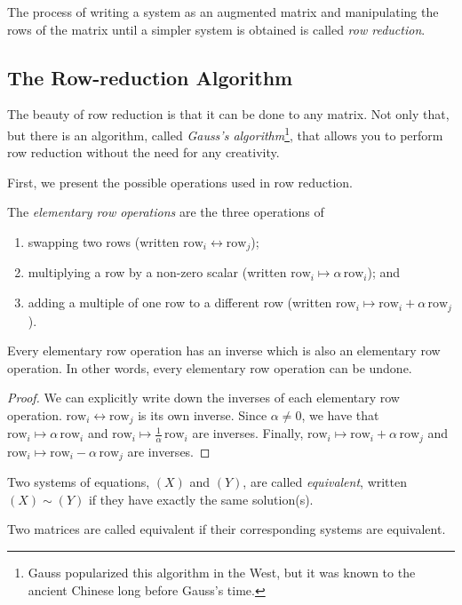 The process of writing a system as an augmented matrix and manipulating
the rows of the matrix until a simpler system is obtained is called
\emph{row reduction}.

\subsection{The Row-reduction Algorithm}
The beauty of row reduction is that it can be done to any matrix. Not only
that, but there is an algorithm, called \emph{Gauss's algorithm}\footnote{ Gauss
popularized this algorithm in the West, but it was known to the ancient Chinese
long before Gauss's time.}, that allows you to perform row reduction without
the need for any creativity.

First, we present the possible operations used in row reduction.
\begin{definition}
	The \emph{elementary row operations}
	are the three operations of
	\begin{enumerate}
		\item swapping two rows (written $\text{row}_i\leftrightarrow\text{row}_j$);
		\item multiplying a row by a non-zero scalar (written
		$\text{row}_i\mapsto \alpha\,\text{row}_i$); and
		\item adding a multiple of one row to a different row (written $\text{row}_i\mapsto
		\text{row}_i+\alpha\,\text{row}_j$).
	\end{enumerate}
\end{definition}
\begin{theorem}
	Every elementary row operation has an inverse which is also an elementary
	row operation. In other words, every elementary row operation can be undone.
\end{theorem}
\begin{proof}
	We can explicitly write down the inverses of each elementary row operation.
	$\text{row}_i\leftrightarrow\text{row}_j$ is its own inverse. Since
	$\alpha\neq 0$, we have that $\text{row}_i\mapsto \alpha\,\text{row}_i$
	and $\text{row}_i\mapsto \tfrac{1}{\alpha}\,\text{row}_i$ are inverses.
	Finally, $\text{row}_i\mapsto
		\text{row}_i+\alpha\,\text{row}_j$
		and $\text{row}_i\mapsto
		\text{row}_i-\alpha\,\text{row}_j$ are inverses.
\end{proof}

\begin{definition}
	Two systems of equations, $(X)$ and $(Y)$, are called \emph{equivalent},
	written $(X)\sim(Y)$ if they have
	exactly the same solution(s). 
	
	Two matrices are called equivalent if their corresponding systems are equivalent.
\end{definition}

